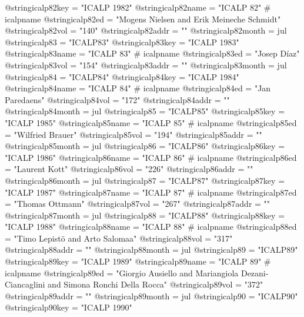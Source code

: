 @string{icalp82key =            "ICALP 1982"}
@string{icalp82name =           "ICALP 82" # icalpname}
@string{icalp82ed =             "Mogens Nielsen and Erik Meineche Schmidt"}
@string{icalp82vol =            "140"}
@string{icalp82addr =           ""}
@string{icalp82month =          jul}
@string{icalp83 =               "ICALP83"}
@string{icalp83key =            "ICALP 1983"}
@string{icalp83name =           "ICALP 83" # icalpname}
@string{icalp83ed =             "Josep D{\'i}az"}
@string{icalp83vol =            "154"}
@string{icalp83addr =           ""}
@string{icalp83month =          jul}
@string{icalp84 =               "ICALP84"}
@string{icalp84key =            "ICALP 1984"}
@string{icalp84name =           "ICALP 84" # icalpname}
@string{icalp84ed =             "Jan Paredaens"}
@string{icalp84vol =            "172"}
@string{icalp84addr =           ""}
@string{icalp84month =          jul}
@string{icalp85 =               "ICALP85"}
@string{icalp85key =            "ICALP 1985"}
@string{icalp85name =           "ICALP 85" # icalpname}
@string{icalp85ed =             "Wilfried Brauer"}
@string{icalp85vol =            "194"}
@string{icalp85addr =           ""}
@string{icalp85month =          jul}
@string{icalp86 =               "ICALP86"}
@string{icalp86key =            "ICALP 1986"}
@string{icalp86name =           "ICALP 86" # icalpname}
@string{icalp86ed =             "Laurent Kott"}
@string{icalp86vol =            "226"}
@string{icalp86addr =           ""}
@string{icalp86month =          jul}
@string{icalp87 =               "ICALP87"}
@string{icalp87key =            "ICALP 1987"}
@string{icalp87name =           "ICALP 87" # icalpname}
@string{icalp87ed =             "Thomas Ottmann"}
@string{icalp87vol =            "267"}
@string{icalp87addr =           ""}
@string{icalp87month =          jul}
@string{icalp88 =               "ICALP88"}
@string{icalp88key =            "ICALP 1988"}
@string{icalp88name =           "ICALP 88" # icalpname}
@string{icalp88ed =             "Timo Lepist{\"o} and Arto Salomaa"}
@string{icalp88vol =            "317"}
@string{icalp88addr =           ""}
@string{icalp88month =          jul}
@string{icalp89 =               "ICALP89"}
@string{icalp89key =            "ICALP 1989"}
@string{icalp89name =           "ICALP 89" # icalpname}
@string{icalp89ed =             "Giorgio Ausiello and Mariangiola Dezani-Ciancaglini and Simona Ronchi Della Rocca"}
@string{icalp89vol =            "372"}
@string{icalp89addr =           ""}
@string{icalp89month =          jul}
@string{icalp90 =               "ICALP90"}
@string{icalp90key =            "ICALP 1990"}
